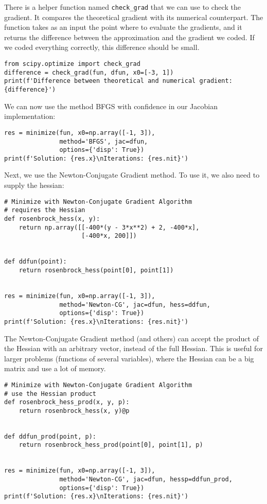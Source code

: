 \documentclass[12pt, a4paper]{article}
\begin{document}
There is a helper function named \texttt{check\_grad} that we can use to check the gradient.
It compares the theoretical gradient with its numerical counterpart.
The function takes as an input the point where to evaluate the gradients, and it returns the difference between the approximation and the gradient we coded.
If we coded everything correctly, this difference should be small.
\lstset{language=jupyter-python,label= ,caption= ,captionpos=b,numbers=none}
\begin{lstlisting}
from scipy.optimize import check_grad
difference = check_grad(fun, dfun, x0=[-3, 1])
print(f'Difference between theoretical and numerical gradient: {difference}')
\end{lstlisting}

We can now use the method BFGS with confidence in our Jacobian implementation:
\lstset{language=jupyter-python,label= ,caption= ,captionpos=b,numbers=none}
\begin{lstlisting}
res = minimize(fun, x0=np.array([-1, 3]),
               method='BFGS', jac=dfun,
               options={'disp': True})
print(f'Solution: {res.x}\nIterations: {res.nit}')
\end{lstlisting}

Next, we use the Newton-Conjugate Gradient method.
To use it, we also need to supply the hessian:
\lstset{language=jupyter-python,label= ,caption= ,captionpos=b,numbers=none}
\begin{lstlisting}
# Minimize with Newton-Conjugate Gradient Algorithm
# requires the Hessian
def rosenbrock_hess(x, y):
    return np.array([[-400*(y - 3*x**2) + 2, -400*x],
                     [-400*x, 200]])


def ddfun(point):
    return rosenbrock_hess(point[0], point[1])


res = minimize(fun, x0=np.array([-1, 3]),
               method='Newton-CG', jac=dfun, hess=ddfun,
               options={'disp': True})
print(f'Solution: {res.x}\nIterations: {res.nit}')
\end{lstlisting}

The Newton-Conjugate Gradient method (and others) can accept the product of the Hessian with an arbitrary vector, instead of the full Hessian.
This is useful for larger problems (functions of several variables), where the Hessian can be a big matrix and use a lot of memory.
\lstset{language=jupyter-python,label= ,caption= ,captionpos=b,numbers=none}
\begin{lstlisting}
# Minimize with Newton-Conjugate Gradient Algorithm
# use the Hessian product
def rosenbrock_hess_prod(x, y, p):
    return rosenbrock_hess(x, y)@p


def ddfun_prod(point, p):
    return rosenbrock_hess_prod(point[0], point[1], p)


res = minimize(fun, x0=np.array([-1, 3]),
               method='Newton-CG', jac=dfun, hessp=ddfun_prod,
               options={'disp': True})
print(f'Solution: {res.x}\nIterations: {res.nit}')
\end{lstlisting}
\end{document}
